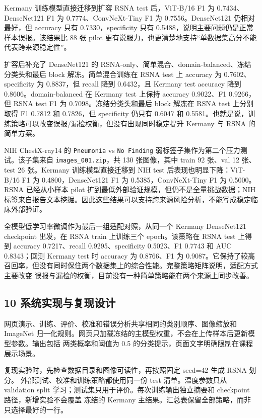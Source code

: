 \documentclass[
]{ctexart}
\begin{document}
Kermany 训练模型直接迁移到扩容 RSNA test 后，ViT-B/16 F1 为
0.7434、DenseNet121 F1 为 0.7774、ConvNeXt-Tiny F1 为
0.7556。DenseNet121 仍相对最好，但 accuracy 只有 0.7330，specificity
只有 0.5488，说明主要问题仍是正常样本误报。该结果比 88 张 pilot
更有说服力，也更清楚地支持``单数据集高分不能代表跨来源稳定性''。

扩容后补充了 DenseNet121 的
RSNA-only、简单混合、domain-balanced、冻结分类头和最后 block
解冻。简单混合训练在 RSNA test 上 accuracy 为 0.7602、specificity 为
0.8837，但 recall 降到 0.6432，且 Kermany test accuracy 降到
0.8606。domain-balanced 在 Kermany test 上保持 accuracy 0.9022、F1
0.9266，但 RSNA test F1 为 0.7098。冻结分类头和最后 block 解冻在 RSNA
test 上分别取得 F1 0.7812 和 0.7826，但 specificity 仍只有 0.6047 和
0.5581。也就是说，训练策略可以改变误报/漏检权衡，但没有出现同时稳定提升
Kermany 与 RSNA 的简单方案。

NIH ChestX-ray14 的 \texttt{Pneumonia} vs \texttt{No\ Finding}
弱标签子集作为第二个压力测试。该子集来自 \texttt{images\_001.zip}，共
130 张图像，其中 train 92 张、val 12 张、test 26 张。Kermany
训练模型直接迁移到 NIH test 后表现也明显下降：ViT-B/16 F1 为
0.4800，DenseNet121 F1 为 0.5385，ConvNeXt-Tiny F1 为 0.5000。RSNA
已经从小样本 pilot 扩到最低外部验证规模，但仍不是全量挑战数据；NIH
标签来自报告文本挖掘。因此这些结果可以支持跨来源风险分析，不能写成稳定临床外部验证。

全模型低学习率微调作为最后一组适配对照，从同一个 Kermany DenseNet121
checkpoint 出发，在 RSNA train 上训练三个 epoch。该策略在 RSNA test 上得到
accuracy 0.7217、recall 0.9295、specificity 0.5023、F1 0.7743 和 AUC
0.8343；回测 Kermany test 时 accuracy 为 0.8766、F1 为 0.9087。它保持了较高
召回率，但没有同时保住两个数据集上的综合性能。完整策略矩阵说明，适配方式主要改变
误报与漏检的权衡，目前没有一种简单策略能在两个来源上同步改善。

\clearpage
\subsection{10 系统实现与复现设计}

网页演示、训练、评价、校准和错误分析共享相同的类别顺序、图像缩放和 ImageNet
归一化规则。网页只加载冻结的主模型权重，不会在上传样本后更新模型参数。输出包括
两类概率和阈值为 0.5 的分类提示，页面文字明确限制在课程展示场景。

复现实验时，先检查数据目录和图像可读性，再按照固定 seed=42 生成 RSNA 划分。
外部测试、校准和训练策略都使用同一份 test 清单。温度参数只从 validation split
学习；测试集只用于评价。每次训练输出独立摘要和 checkpoint 路径，新增实验不会覆盖
冻结的 Kermany 主结果。汇总表保留全部策略，而非只选择最好的一行。
\end{document}
